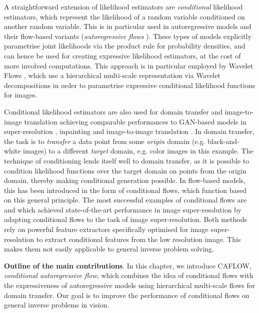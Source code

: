 A straightforward extension of likelihood estimators are \emph{conditional} likelihood estimators, which represent the likelihood of a random variable conditioned on another random variable. This is in particular used in autoregressive models and their flow-based variants (\emph{autoregressive flows} \cite{autoregressive_flows}). These types of models explicitly parametrise joint likelihoods via the product rule for probability densities, and can hence be used for creating expressive likelihood estimators, at the cost of more involved computations. This approach is in particular employed by Wavelet Flows \cite{WAVELET-FLOW}, which use a hierarchical multi-scale representation via Wavelet decompositions in order to parametrise expressive conditional likelihood functions for images.

Conditional likelihood estimators are also used for domain transfer and image-to-image translation \cite{Dual-Glow, SRFLOW, ardizzone2019guided, cGLOW} achieving comparable performances to GAN-based models in super-resolution \cite{SRFLOW, HCFLOW}, inpainting \cite{cGLOW} and image-to-image translation \cite{Pumarola2020, Dual-Glow, grover2020alignflow}. In domain transfer, the task is to \emph{transfer} a data point from some \emph{origin} domain (e.g. black-and-white images) to a different \emph{target} domain, e.g. color images in this example. The technique of conditioning lends itself well to domain transfer, as it is possible to condition likelihood functions over the target domain on points from the origin domain, thereby making conditional generation possible. In flow-based models, this has been introduced in the form of conditional flows, which function based on this general principle. The most successful examples of conditional flows are \cite{SRFLOW} and \cite{HCFLOW} which achieved state-of-the-art performance in image super-resolution by adapting conditional flows to the task of image super-resolution. Both methods rely on powerful feature extractors specifically optimised for image super-resolution to extract conditional features from the low resolution image. This makes them not easily applicable to general inverse problem solving.

\medskip

\textbf{Outline of the main contributions}. In this chapter, we introduce CAFLOW, \emph{conditional autoregressive flow}, which combines the idea of conditional flows with the expressiveness of autoregressive models using hierarchical multi-scale flows for domain transfer. Our goal is to improve the performance of conditional flows on %
general inverse problems in vision.\color{black}


